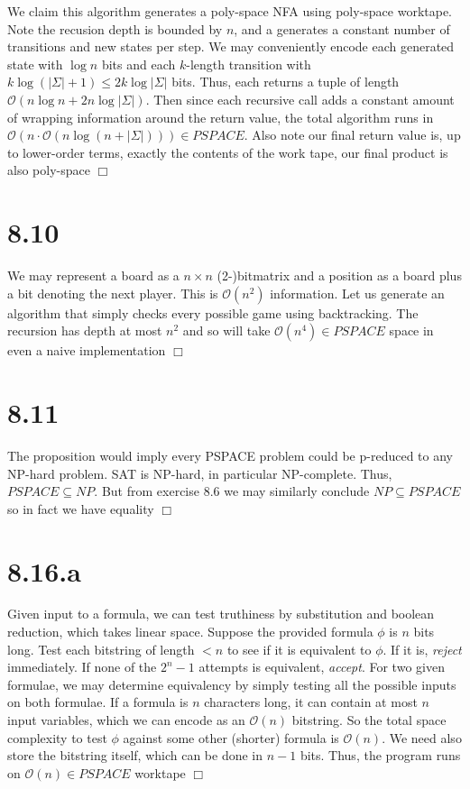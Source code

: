 \documentclass{article}
\begin{document}
We claim this algorithm generates a poly-space NFA using poly-space worktape. Note the recusion depth is bounded by $n$, and a  generates a constant number of transitions and new states per step. We may conveniently encode each generated state with $\log n$ bits and each $k$-length transition with $k\log (|\Sigma|+1) \leq 2k\log|\Sigma|$ bits. Thus, each  returns a tuple of length $\mathcal{O}(n\log n + 2n\log |\Sigma|)$. Then since each recursive call adds a constant amount of wrapping information around the return value, the total algorithm runs in $\mathcal{O}(n \cdot \mathcal{O}(n\log (n + |\Sigma|))) \in PSPACE$. Also note our final return value is, up to lower-order terms, exactly the contents of the work tape, our final product is also poly-space $\Box$

\section*{8.10}
We may represent a board as a $n \times n$ (2-)bitmatrix and a position as a board plus a bit denoting the next player. This is $\mathcal{O}(n^2)$ information. Let us generate an algorithm that simply checks every possible game using backtracking. The recursion has depth at most $n^2$ and so will take $\mathcal{O}(n^4) \in PSPACE$ space in even a naive implementation $\Box$

\section*{8.11}
The proposition would imply every PSPACE problem could be p-reduced to any NP-hard problem. SAT is NP-hard, in particular NP-complete. Thus, $PSPACE \subseteq NP$. But from exercise 8.6 we may similarly conclude $NP \subseteq PSPACE$ so in fact we have equality $\Box$

\section*{8.16.a}
Given input to a formula, we can test truthiness by substitution and boolean reduction, which takes linear space. Suppose the provided formula $\phi$ is $n$ bits long. Test each bitstring of length $<n$ to see if it is equivalent to $\phi$. If it is, \textit{reject} immediately. If none of the $2^n-1$ attempts is equivalent, \textit{accept}. For two given formulae, we may determine equivalency by simply testing all the possible inputs on both formulae. If a formula is $n$ characters long, it can contain at most $n$ input variables, which we can encode as an $\mathcal{O}(n)$ bitstring. So the total space complexity to test $\phi$ against some other (shorter) formula is $\mathcal{O}(n)$. We need also store the bitstring itself, which can be done in $n-1$ bits. Thus, the program runs on $\mathcal{O}(n) \in PSPACE$ worktape $\Box$
\end{document}
